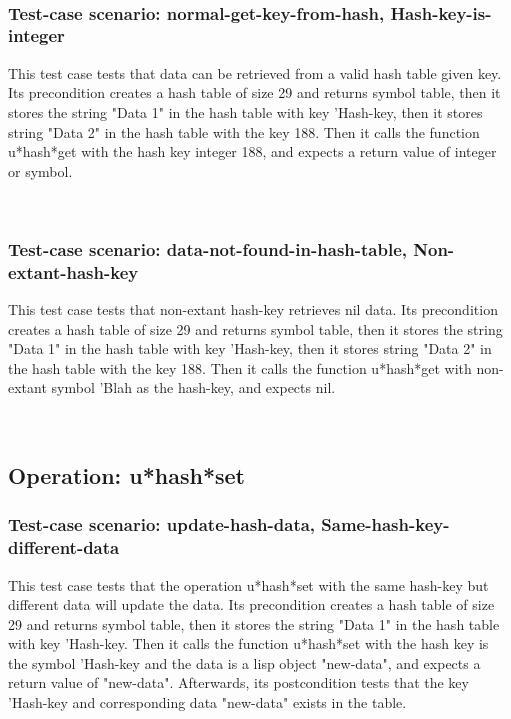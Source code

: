 \
\subsubsection {Test-case scenario: normal-get-key-from-hash, Hash-key-is-integer}


This test case tests that data can be retrieved from a valid hash table given key.
Its precondition creates a hash table of size 29 and returns symbol table, then it stores the string "Data 1" in the hash table with key 'Hash-key, then it stores string "Data 2" in the hash table with the key 188.
Then it calls the function u*hash*get  with the hash key integer 188, and expects a return value of integer or symbol.





\
\subsubsection {Test-case scenario: data-not-found-in-hash-table, Non-extant-hash-key}


This test case tests that non-extant hash-key retrieves nil data.
Its precondition creates a hash table of size 29 and returns symbol table, then it stores the string "Data 1" in the hash table with key 'Hash-key, then it stores string "Data 2" in the hash table with the key 188.
Then it calls the function u*hash*get  with non-extant symbol 'Blah as the hash-key, and expects nil.





\
\subsection {Operation: u*hash*set}
\subsubsection {Test-case scenario: update-hash-data, Same-hash-key-different-data}


This test case tests that the operation u*hash*set with the same hash-key but different data will update the data.
Its precondition creates a hash table of size 29 and returns symbol table, then it stores the string "Data 1" in the hash table with key 'Hash-key.
Then it calls the function u*hash*set  with the hash key is the symbol 'Hash-key and the data is a lisp object "new-data", and expects a return value of "new-data".
Afterwards, its postcondition tests that the key 'Hash-key and corresponding data "new-data" exists in the table.


